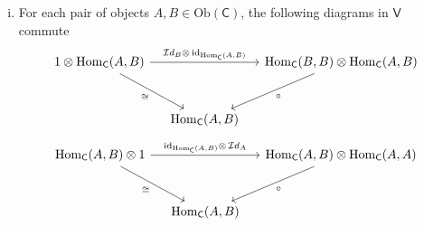 {\begin{enumerate}[(i)]
\[\begin{tikzcd}[ampersand replacement=\&, column sep=small]
                    \&                                                                                                                                    \& {\mathrm{Hom}(A,D)} \&                                                                                                               \&                                                                   
\end{tikzcd}
    \]
    \item For each pair of objects $A,B\in \mathrm{Ob}(\mathsf{C})$, the following diagrams in $\mathsf{V}$ commute
    \[
    \begin{tikzcd}[ampersand replacement=\&, column sep=small]
        {1\otimes \mathrm{Hom}_{\mathsf{C}}(A,B)} \arrow[rr, "{{\mathcal{I}d}_B\otimes\,\mathrm{id}_{\mathrm{Hom}_{\mathsf{C}}(A,B)}}"] \arrow[rd, "\cong"'] \&                     \& {\mathrm{Hom}_{\mathsf{C}}(B,B)\otimes \mathrm{Hom}_{\mathsf{C}}(A,B)} \arrow[ld, "\circ"] \\[+10pt]
        \& {\mathrm{Hom}_{\mathsf{C}}(A,B)} \&   
\end{tikzcd}
    \]
    \[
        \begin{tikzcd}[ampersand replacement=\&, column sep=small]
            {\mathrm{Hom}_{\mathsf{C}}(A,B)\otimes 1} \arrow[rr, "\mathrm{id}_{\mathrm{Hom}_{\mathsf{C}}(A,B)}\otimes\,{\mathcal{I}d}_A "] \arrow[rd, "\cong"'] \&                     \& {\mathrm{Hom}_{\mathsf{C}}(A,B)\otimes \mathrm{Hom}_{\mathsf{C}}(A,A)} \arrow[ld, "\circ"] \\[+10pt]
            \& {\mathrm{Hom}_{\mathsf{C}}(A,B)} \&
    \end{tikzcd}
        \]
    \end{enumerate}
}

